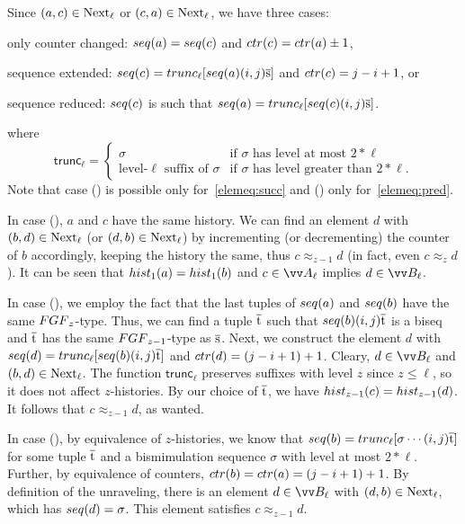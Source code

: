 \begin{proofsketch}
  Since $(a,c) \in \mathrm{Next}_{\ell}$ or $(c,a) \in \mathrm{Next}_{\ell}$, we have three cases:
  \begin{romanenumerate}
    \item only counter changed: $\seq{a} = \seq{c}$ and $\ctr{c} = \ctr{a} \pm 1$,
    \item sequence extended: $\seq{c} = \mathsf{trunc}_{\ell}[\seq{a} (i,j) \elemtuples]$ and $\ctr{c} = j-i+1$, or
    \item sequence reduced: $\seq{c}$ is such that $\seq{a} = \mathsf{trunc}_{\ell}[\seq{c} (i,j) \elemtuples]$.
  \end{romanenumerate}
  where
  \begin{displaymath}
    \mathsf{trunc}_{\ell} =
    \begin{cases}
      \sigma & \text{if $\sigma$ has level at most $2 * \ell$} \\
      \text{level-$\ell$ suffix of $\sigma$} & \text{if $\sigma$ has level greater than $2 * \ell$.}
    \end{cases}
  \end{displaymath}
  Note that case () is possible only for~\ref{elemeq:succ} and () only for~\ref{elemeq:pred}.

  In case (), $a$ and $c$ have the same history.
  We can find an element $d$ with $(b,d) \in \mathrm{Next}_{\ell}$ (or $(d,b) \in \mathrm{Next}_{\ell}$) by incrementing (or decrementing) the counter of $b$ accordingly, keeping the history the same, thus $c \approx_{z-1} d$ (in fact, even $c \approx_{z} d$).
  It can be seen that $\hist{1}{a} = \hist{1}{b}$ and $c \in \unraveldom{A}_{\ell}$ implies $d \in \unraveldom{B}_{\ell}$.

  In case (), we employ the fact that the last tuples of $\seq{a}$ and $\seq{b}$ have the same $\FGF_{z}$-type.
  Thus, we can find a tuple $\overline{\mathrm{t}}$ such that $\seq{b} (i,j) \elemtuplet$ is a biseq and $\overline{\mathrm{t}}$ has the same $\FGF_{z{-}1}$-type as $\overline{\mathrm{s}}$.
  Next, we construct the element $d$ with $\seq{d} = \mathsf{trunc}_{\ell}[\seq{b}(i,j)\elemtuplet]$ and $\ctr{d} = (j-i+1) + 1$.
  Cleary, $d \in \unraveldom{B}_{\ell}$ and $(b,d) \in \mathrm{Next}_{\ell}$.
  The function $\mathsf{trunc}_{\ell}$ preserves suffixes with level $z$ since $z \le \ell$, so it does not affect $z$-histories.
  By our choice of $\overline{\mathrm{t}}$, we have $\hist{z-1}{c} = \hist{z-1}{d}$.
  It follows that $c \approx_{z-1} d$, as wanted.

  In case (), by equivalence of $z$-histories, we know that $\seq{b} = \mathsf{trunc}_{\ell}[\sigma \cdots(i,j)\elemtuplet]$ for some tuple $\overline{\mathrm{t}}$ and a bismimulation sequence $\sigma$ with level at most $2 * \ell$.
  Further, by equivalence of counters, $\ctr{b} = \ctr{a} = (j-i+1) + 1$.
  By definition of the unraveling, there is an element $d \in \unraveldom{B}_{\ell}$ with $(d,b) \in \mathrm{Next}_{\ell}$, which has $\seq{d} = \sigma$.
  This element satisfies $c \approx_{z-1} d$.
\end{proofsketch}
